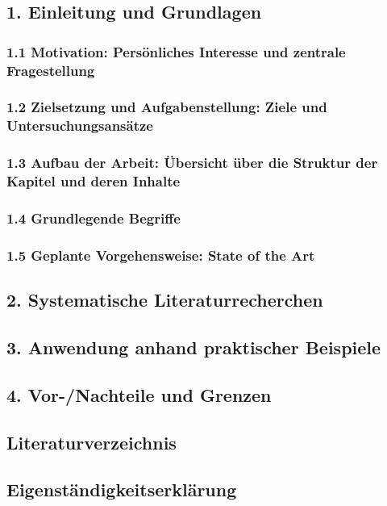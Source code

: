 \subsection*{1. Einleitung und Grundlagen}
\subsubsection*{1.1 Motivation: Persönliches Interesse und zentrale Fragestellung}
\subsubsection*{1.2 Zielsetzung und Aufgabenstellung: Ziele und Untersuchungsansätze}
\subsubsection*{1.3 Aufbau der Arbeit: Übersicht über die Struktur der Kapitel und deren Inhalte}
\subsubsection*{1.4 Grundlegende Begriffe}
\subsubsection*{1.5 Geplante Vorgehensweise: State of the Art}
\subsection*{2. Systematische Literaturrecherchen}
\subsection*{3. Anwendung anhand praktischer Beispiele}
\subsection*{4. Vor-/Nachteile und Grenzen} 
\subsection*{Literaturverzeichnis} 
\subsection*{Eigenständigkeitserklärung}

\label{sec:einl_aufbau}
\newpage





